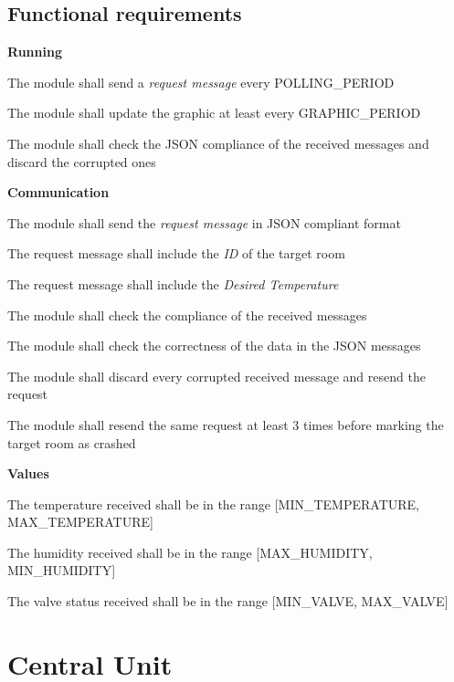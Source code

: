 \subsection{Functional requirements}
\begin{req_enum}
	\item \textbf{Running}
	\begin{req_enum}[label*=\arabic*.]
		\item The module shall send a \textit{request message} every POLLING\_PERIOD
		\item The module shall update the graphic at least every GRAPHIC\_PERIOD
		\item The module shall check the JSON compliance of the received messages and discard the corrupted ones
	\end{req_enum}

	\item \textbf{Communication}
	\begin{req_enum}[label*=\arabic*.]
		\item The module shall send the \textit{request message} in JSON compliant format
		\begin{req_enum}[label*=\arabic*.]
			\item The request message shall include the \textit{ID} of the target room
			\item The request message shall include the \textit{Desired Temperature}
		\end{req_enum}
		\item The module shall check the compliance of the received messages
		\item The module shall check the correctness of the data in the JSON messages
		\item The module shall discard every corrupted received message and resend the request
		\item The module shall resend the same request at least 3 times before marking the target room as crashed
	\end{req_enum}

	\item \textbf{Values}
	\begin{req_enum}[label*=\arabic*.]
		\item The temperature received shall be in the range [MIN\_TEMPERATURE, MAX\_TEMPERATURE]
		\item The humidity received shall be in the range [MAX\_HUMIDITY, MIN\_HUMIDITY]
		\item The valve status received shall be in the range [MIN\_VALVE, MAX\_VALVE]
	\end{req_enum}

\end{req_enum}
\section{Central Unit}

